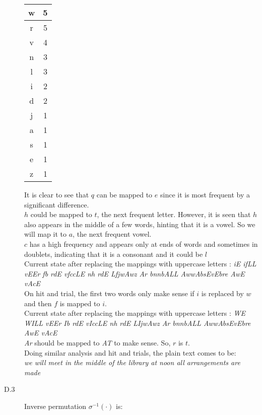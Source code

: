 \documentclass{article}
\begin{document}
\begin{description}[leftmargin=*]
\begin{framed}
\begin{description}
\begin{center}
\begin{tabular}{|c | c|}
					w & 5\\
					\hline
					r & 5\\
					\hline
					v & 4 \\
					\hline
					n & 3 \\
					\hline
					l & 3 \\
					\hline
					i & 2 \\
					\hline
					d & 2\\
					\hline
					j & 1\\
					\hline
					a & 1\\
					\hline
					s & 1\\
					\hline
					e & 1\\
					\hline
					z & 1\\
					\hline
				\end{tabular}
			\end{center}
			It is clear to see that $q$ can be mapped to $e$ since it is most frequent by a significant difference.\\
			$h$ could be mapped to $t$, the next frequent letter. However, it is seen that $h$ also appears in the middle of a few words, hinting that it is a vowel. So we will map it to $a$, the next frequent vowel.\\
			$c$ has a high frequency and appears only at ends of words and sometimes in doublets, indicating that it is a consonant and it could be $l$\\
			Current state after replacing the mappings with uppercase letters : {\it iE ifLL vEEr fb rdE vfccLE nh rdE LfjwAwz Ar bnnbALL AwwAbsEvEbre AwE vAcE}\\
			On hit and trial, the first two words only make sense if $i$ is replaced by $w$ and then $f$ is mapped to $i$.\\
			Current state after replacing the mappings with uppercase letters : {\it WE WILL vEEr Ib rdE vIccLE nh rdE LIjwAwz Ar bnnbALL AwwAbsEvEbre AwE vAcE}\\
			{\it Ar} should be mapped to {\it AT} to make sense. So, $r$ is $t$.\\
			Doing similar analysis and hit and trials, the plain text comes to be:\\
			{\color{blue}\it we will meet in the middle of the library at noon all arrangements are made}
			\newpage
			\item[D.3] Inverse permutation $\sigma^{-1}(\cdot)$ is:
			\begin{center}
				\begin{tabular}{|c | c | c | c | c | c | c|}

\end{tabular}
\end{center}
\end{description}
\end{framed}
\end{description}
\end{document}

